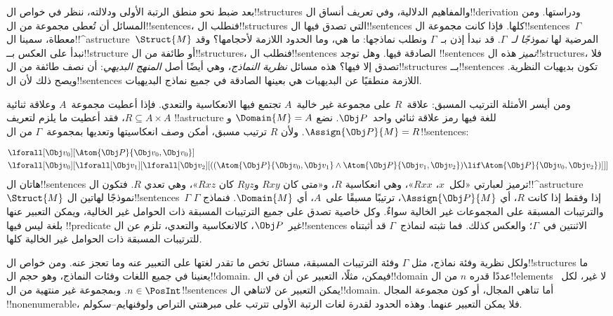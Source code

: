 \documentclass[../../../include/open-logic-section]{subfiles}
\begin{document}


بعد ضبط نحو منطق الرتبة الأولى ودلالته، ننظر في خواص
ال!!{structure}s والمفاهيم الدلالية، وفي تعريف أنساق
ال!!{derivation} ودراستها. ومن المسائل أن تُعطى مجموعة من
ال!!{sentence}s، فنطلب ال!!{structure}s التي تصدق فيها
ال!!{sentence}s كلها. فإذا كانت مجموعة ال!!{sentence}s~$\Gamma$
معطاة، سمينا ال!!^a{structure}~$\Struct{M}$ المرضية لها
\emph{نموذجًا لـ~$\Gamma$}. قد نبدأ إذن بـ~$\Gamma$ ونطلب
نماذجها: ما هي، وما الحدود اللازمة لأحجامها؟ وقد نبدأ على العكس
بــ!!{structure} أو طائفة من ال!!{structure}s، فنطلب
ال!!{sentence}s الصادقة فيها. وهل توجد !!{sentence}s
\emph{تميز} هذه ال!!{structure}s، فلا تصدق إلا فيها؟
هذه مسائل \emph{نظرية النماذج}، وهي أيضًا أصل
\emph{المنهج البديهي}: أن نصف طائفة من ال!!{structure}s
بــ!!{sentence}s تكون بديهيات النظرية. ويصح ذلك لأن
ال!!{sentence}s اللازمة منطقيًا عن البديهيات هي بعينها الصادقة
في جميع نماذج البديهيات.

ومن أيسر الأمثلة الترتيب المسبق: علاقة~$R$ على مجموعة غير خالية~$A$
تجتمع فيها الانعكاسية والتعدي. فإذا أعطيت مجموعة~$A$ وعلاقة
ثنائية $R \subseteq A \times A$، فقد أعطيت ما يلزم لتعريف
!!a{structure} للغة فيها رمز علاقة ثنائي واحد~$\Obj P$.
نضع $\Domain{M} = A$ و$\Assign{\Obj P}{M} = R$.
ولأن $R$ ترتيب مسبق، أمكن وصف انعكاسيتها وتعديها
بمجموعة~$\Gamma$ من ال!!{sentence}s:

\begin{align*}
  & \lforall[\Obj v_0][\Atom{\Obj P}{\Obj v_0,\Obj v_0}]\\
  & \lforall[\Obj v_0][\lforall[\Obj v_1][\lforall[\Obj v_2][((\Atom{\Obj P}{\Obj v_0,\Obj v_1} \land \Atom{\Obj P}{\Obj v_1,\Obj v_2}) \lif \Atom{\Obj P}{\Obj v_0,\Obj v_2})]]]
\end{align*}
هاتان ال!!{sentence}s ترميز لعبارتي «لكل~$x$،
$Rxx$»، وهي انعكاسية $R$، و«متى كان $Rxy$ و$Ryz$ كان
$Rxz$»، وهي تعدي $R$. فتكون ال!!^a{structure}~$\Struct{M}$
نموذجًا لهاتين ال!!{sentence}s~$\Gamma$ إذا وفقط إذا كانت
$R$، أي $\Assign{\Obj P}{M}$، ترتيبًا مسبقًا على~$A$،
أي $\Domain{M}$. فنماذج $\Gamma$ والترتيبات المسبقة على المجموعات غير الخالية سواءٌ.
وكل خاصية تصدق على جميع الترتيبات المسبقة ذات الحوامل غير الخالية، ويمكن التعبير عنها
بلغة ليس فيها !!{predicate} غير~$\Obj P$، كالانعكاسية
والتعدي، تلزم عن ال!!{sentence}s الاثنتين في~$\Gamma$؛
والعكس كذلك. فما نثبته لنماذج~$\Gamma$ قد أثبتناه
للترتيبات المسبقة ذات الحوامل غير الخالية كلها.

ولكل نظرية وفئة نماذج، مثل $\Gamma$ وفئة الترتيبات المسبقة،
مسائل تخص ما تقدر لغتها على التعبير عنه وما تعجز عنه.
ومن خواص ال!!{structure}s ما يعنينا في جميع اللغات وفئات
النماذج، وهو حجم ال!!{domain}. فيمكن، مثلًا، التعبير عن
أن في ال!!{domain} عددًا قدره $n$ من ال!!{element}s
لا غير، لكل~$n \in \PosInt$. وبمجموعة غير منتهية من
ال!!{sentence}s يمكن التعبير عن لاتناهي ال!!{domain}.
أما تناهي المجال، أو كون مجموعة المجال !!{nonenumerable}،
فلا يمكن التعبير عنهما. وهذه الحدود لقدرة لغات الرتبة الأولى
تترتب على مبرهنتي التراص ولوفنهايم--سكولم.
\end{document}
